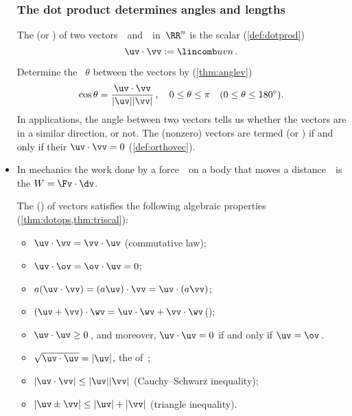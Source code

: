 \begin{itemize}
\subsubsection{The dot product determines angles and lengths}

\itemhi The  (or ) of two vectors~\uv\ and~\vv\ in~\(\RR^n\) is the scalar (\cref{def:dotprod})
\begin{equation*}
\uv\cdot \vv:= \lincomb uvn\,.
\end{equation*}
\begin{itemize}
\itemhi  Determine the ~\(\theta\) between the vectors by (\cref{thm:anglev})
\begin{equation*}
\cos\theta=\frac{\uv\cdot\vv}{|\uv||\vv|}\,,
\quad 0\leq\theta\leq\pi
\quad (0\leq\theta\leq180^\circ).
\end{equation*}
In applications, the angle between two vectors tells us whether the vectors are in a similar direction, or not.
\itemhi The (nonzero) vectors are termed  (or ) if and only if their  \(\uv\cdot\vv=0\) (\cref{def:orthovec}).
\end{itemize}

\item In mechanics the work done by a force~\Fv\ on a body that moves a distance~\dv\ is the  \(W=\Fv\cdot\dv\).

\itemme The  () of vectors 
satisfies the following algebraic properties (\cref{thm:dotops,thm:triscal}):
\begin{itemize}
\item \(\uv\cdot\vv=\vv\cdot\uv\) \quad({commutative law});
\item \(\uv\cdot\ov=\ov\cdot\uv=0\);
\item \(a(\uv\cdot\vv)=(a\uv)\cdot\vv=\uv\cdot(a\vv)\);
\item \((\uv+\vv)\cdot\wv=\uv\cdot\wv+\vv\cdot\wv\)\quad();
\item \(\uv\cdot\uv\geq0\)\,, and moreover, \(\uv\cdot\uv=0\) if and only if \(\uv=\ov\)\,.
\item \(\sqrt{\uv\cdot\uv}=|\uv|\), the  of~\uv;
\item \(|\uv\cdot\vv|\leq|\uv||\vv|\) ({Cauchy--Schwarz inequality});
\item \(|\uv\pm\vv|\leq|\uv|+|\vv|\) ({triangle inequality}).
\end{itemize}


\end{itemize}
